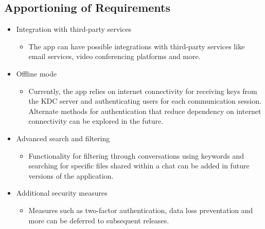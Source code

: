 \documentclass[]{article}
\begin{document}
\subsection{Apportioning of Requirements}
\label{sub:apportioning_of_requirements}
\begin{itemize}
	\item Integration with third-party services
 	\begin{itemize}
  		\item The app can have possible integrations with third-party services like email services, video conferencing platforms and more.
    	\end{itemize}
     	\item Offline mode
      	\begin{itemize}
  		\item Currently, the app relies on internet connectivity for receiving keys from the KDC server and authenticating users for each communication session. Alternate methods for authentication that reduce dependency on internet connectivity can be explored in the future.
    	\end{itemize}
     	\item Advanced search and filtering
      	\begin{itemize}
       		\item Functionality for filtering through conversations using keywords and searching for specific files shared within a chat can be added in future versions of the application.
	\end{itemize}
  	\item Additional security measures
   	\begin{itemize}
    		\item Measures such as two-factor authentication, data loss preventation and more can be deferred to subsequent releases.
      	\end{itemize}
\end{itemize}

\end{document}
